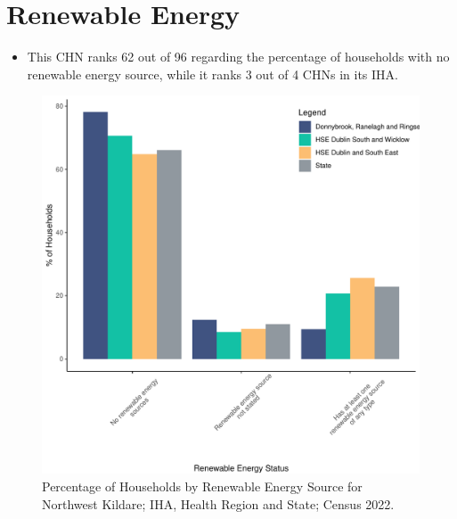 \documentclass{article}
\begin{document}
\section{Renewable Energy}\label{sect:RE}
\begin{itemize}
\item This CHN ranks  62 out of 96 regarding the percentage of households with no renewable energy source, while it ranks   3 out of 4 CHNs in its IHA.
\end{itemize}
\begin{figure}[H]
	\centering
	\includegraphics[width = 140mm]{../figures/RenewableEnergyED.pdf}
	\caption{Percentage of Households by Renewable Energy Source for Northwest Kildare; IHA, Health Region and State; Census 2022.}
	\label{fig:vbnv}
	\end{figure}
\end{document}
